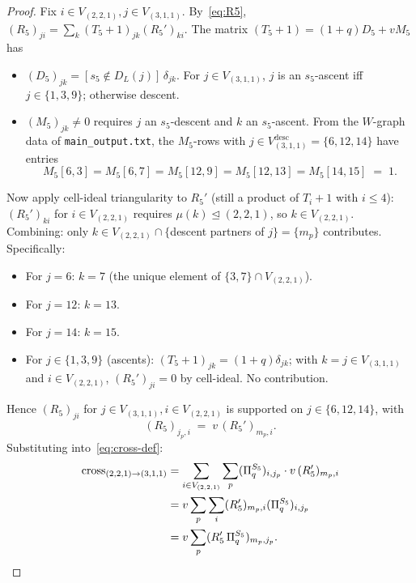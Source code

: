 \documentclass[11pt]{article}
\theoremstyle{definition}
\begin{document}
\begin{proof}
Fix $i \in V_{(2,2,1)}, j \in V_{(3,1,1)}$. By~\eqref{eq:R5}, $(R_5)_{ji} = \sum_k (T_5+1)_{jk}(R_5')_{ki}$. The matrix $(T_5+1) = (1+q)D_5 + vM_5$ has
\begin{itemize}[leftmargin=2em,topsep=0.2em,itemsep=0.1em]
\item $(D_5)_{jk} = [s_5 \notin D_L(j)]\,\delta_{jk}$. For $j \in V_{(3,1,1)}$, $j$ is an $s_5$-ascent iff $j \in \{1,3,9\}$; otherwise descent.
\item $(M_5)_{jk} \neq 0$ requires $j$ an $s_5$-descent and $k$ an $s_5$-ascent. From the $W$-graph data of \texttt{main\_output.txt}, the $M_5$-rows with $j \in V_{(3,1,1)}^{\text{desc}} = \{6, 12, 14\}$ have entries
\[
M_5[6, 3] = M_5[6, 7] = M_5[12, 9] = M_5[12, 13] = M_5[14, 15] \;=\; 1.
\]
\end{itemize}

Now apply cell-ideal triangularity to $R_5'$ (still a product of $T_i+1$ with $i \leq 4$): $(R_5')_{ki}$ for $i \in V_{(2,2,1)}$ requires $\mu(k) \trianglelefteq (2,2,1)$, so $k \in V_{(2,2,1)}$. Combining: only $k \in V_{(2,2,1)} \cap \{$descent partners of $j\} = \{m_p\}$ contributes. Specifically:
\begin{itemize}[leftmargin=2em,topsep=0.1em,itemsep=0.1em]
\item For $j = 6$: $k = 7$ (the unique element of $\{3, 7\} \cap V_{(2,2,1)}$).
\item For $j = 12$: $k = 13$.
\item For $j = 14$: $k = 15$.
\item For $j \in \{1, 3, 9\}$ (ascents): $(T_5+1)_{jk} = (1+q)\delta_{jk}$; with $k = j \in V_{(3,1,1)}$ and $i \in V_{(2,2,1)}$, $(R_5')_{ji} = 0$ by cell-ideal. No contribution.
\end{itemize}

Hence $(R_5)_{ji}$ for $j \in V_{(3,1,1)}, i \in V_{(2,2,1)}$ is supported on $j \in \{6,12,14\}$, with
\[
(R_5)_{j_p, i} \;=\; v\, (R_5')_{m_p, i}.
\]
Substituting into~\eqref{eq:cross-def}:
\begin{align*}
\mathrm{cross}_{(2,2,1)\to(3,1,1)} &= \sum_{i \in V_{(2,2,1)}}\sum_{p}(\Pi_q^{S_5})_{i, j_p}\cdot v\,(R_5')_{m_p, i} \\
&= v\sum_p \sum_i (R_5')_{m_p, i}(\Pi_q^{S_5})_{i, j_p} \\
&= v\sum_p (R_5'\,\Pi_q^{S_5})_{m_p, j_p}. \qedhere
\end{align*}
\end{proof}
\end{document}
